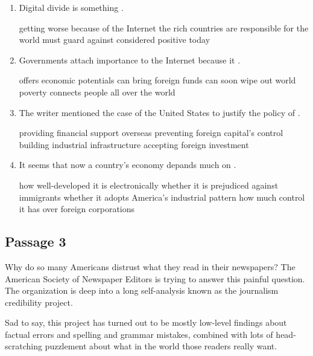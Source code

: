 \begin{enumerate}[resume]
	\item
Digital divide is something \lineread.


\fourchoices
{getting worse because of the Internet}
{the rich countries are responsible for}
{the world must guard against}
{considered positive today}


\item
 Governments attach importance to the Internet because it \lineread.


\fourchoices
{offers economic potentials}
{can bring foreign funds}
{can soon wipe out world poverty}
{connects people all over the world}


\item
The writer mentioned the case of the United States to justify the
policy of \lineread.


\fourchoices
{providing financial support overseas}
{preventing foreign capital's control}
{building industrial infrastructure}
{accepting foreign investment}



\item
It seems that now a country's economy depands much on \lineread.


\fourchoices
{how well-developed it is electronically}
{whether it is prejudiced against immigrants}
{whether it adopts America's industrial pattern}
{how much control it has over foreign corporations}
	
\end{enumerate}



\newpage
\subsection{Passage 3}

Why do so many Americans distrust what they read in their newspapers?
The American Society of Newspaper Editors is trying to answer this
painful question. The organization is deep into a long self-analysis
known as the journalism credibility project.

Sad to say, this project has turned out to be mostly low-level findings
about factual errors and spelling and grammar mistakes, combined with
lots of head-scratching puzzlement about what in the world those readers
really want.

